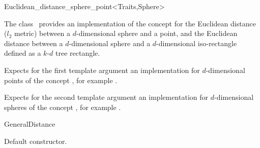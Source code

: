 

\begin{ccRefClass}{Euclidean_distance_sphere_point<Traits,Sphere>}  %


\ccDefinition
  
The class \ccRefName\ provides an implementation of the
 concept for the Euclidean distance ($l_2$
metric) between a $d$-dimensional sphere and a point, and the
Euclidean distance between a $d$-dimensional sphere and a
$d$-dimensional iso-rectangle defined as a $k$-$d$ tree rectangle.



\ccParameters
Expects for the first template argument an implementation for
$d$-dimensional points of the concept , for example
.

Expects for the second template argument an implementation 
for $d$-dimensional spheres of the concept ,
for example .


\ccIsModel

GeneralDistance

\ccTypes



\ccCreation
{}  %


{Default constructor.}

\ccOperations



\end{ccRefClass}
